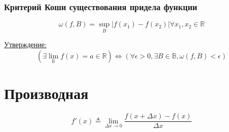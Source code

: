 \documentclass{article}
\begin{document}
\subsubsection{Критерий Коши существования придела функции}

\[
\omega(f, B) = \sup \limits_{B} |f(x_1) - f(x_2)| \forall x_1, x_2 \in \mathbb{R}
\]

\underline{Утверждение:}
\[
\left(
	\exists \lim_{\mathbb{B}} f(x) = a \in \mathbb{R}
\right) \Leftrightarrow \left(
	\forall \epsilon > 0, \exists B \in \mathbb{B}, \omega(f, B) < \epsilon
\right)
\]

\section{Производная}

\[
f'(x) \triangleq \lim_{\Delta x \to 0} \frac{f(x + \Delta x) - f(x)}{\Delta x}
\]
\end{document}
